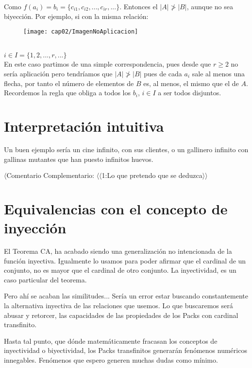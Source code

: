 Como $f(a_{i}) = b_{i} = \{c_{i1}, c_{i2}, ... , c_{ir}, ... \}$. Entonces el $|A| \ngtr |B|$, aunque no sea biyección.
\newpage
Por ejemplo, si con la misma relación:
\begin{figure}[h!]
	\texttt{[image: cap02/ImagenNoAplicacion]}
	\centering
\end{figure}\\
\noindent
$i \in I=\{ 1, 2, ..., r, ...\}$\\

En este caso partimos de una simple correspondencia, pues desde que $r\geq 2$ no sería aplicación pero tendríamos que $|A| \ngtr |B|$ pues de cada $a_{i}$ sale al menos una flecha, por tanto el número de elementos de $B$ es, al menos, el mismo que el de $A$. Recordemos la regla que obliga a todos los $b_{i}$, $i \in I$ a ser todos disjuntos.











\newpage
\section{Interpretación intuitiva}
Un buen ejemplo sería un cine infinito, con sus clientes, o un gallinero infinito con gallinas mutantes que han puesto infinitos huevos.

$\langle$Comentario Complementario: $\langle\langle$1:Lo que pretendo que se deduzca$\rangle\rangle$

\newpage
\section{Equivalencias con el concepto de inyección}

El Teorema CA, ha acabado siendo una generalización no intencionada de la función inyectiva. Igualmente lo usamos para poder afirmar que el cardinal de un conjunto, no es mayor que el cardinal de otro conjunto. La inyectividad, es un caso particular del teorema.

Pero ahí se acaban las similitudes... Sería un error estar buscando constantemente la alternativa inyectiva de las relaciones que usemos. Lo que buscaremos será abusar y retorcer, las capacidades de las propiedades de los Packs con cardinal transfinito.

Hasta tal punto, que dónde matemáticamente fracasan los conceptos de inyectividad o biyectividad, los Packs transfinitos generarán fenómenos numéricos innegables. Fenómenos que espero generen muchas dudas como mínimo.
